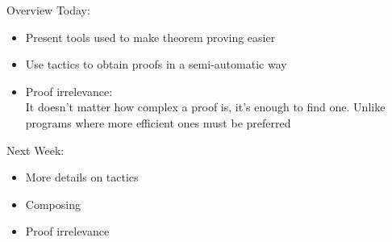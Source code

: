 \begin{frame}{Overview}
	Today:
	\begin{itemize}
		\item Present tools used to make theorem proving easier
		\pause
		\item Use tactics to obtain proofs in a semi-automatic way
		\pause
		\item Proof irrelevance:\\
		It doesn't matter how complex a proof is, it's enough to find one. Unlike programs where more efficient ones must be preferred
	\pause
	\end{itemize}
	Next Week:
	\begin{itemize}
		\item More details on tactics
		\pause
		\item Composing
		\pause
		\item Proof irrelevance
	\end{itemize}
\end{frame}

